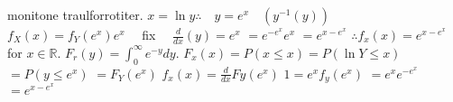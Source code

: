 monitone traulforrotiter.
$x=\ln y \therefore \quad y=e^{x} \quad\left(y^{-1}(y)\right)$
$f_{X}(x)=f_{Y}\left(e^{x}\right) e^{x} \quad$ fix $\quad \frac{d}{d x}(y)=e^{x}$
$=e^{-e^{x}} e^{x}$
$=e^{x-e^{x}}$
$\therefore f_{x}(x)=e^{x-e^{x}} \quad$ for $x \in \mathbb{R}$.
$F_{r}(y)=\int_{0}^{\infty} e^{-y} d y$.
$F_{x}(x)=P(x \leq x)=P(\ln Y \leq x)$
$=P\left(y \leq e^{x}\right)$
$=F_{Y}\left(e^{x}\right)$
$f_{x}(x)=\frac{d}{d x} F y\left(e^{x}\right)$
$1=e^{x} f_{y}\left(e^{x}\right)$
$=e^{x} e^{-e^{x}}$
$=e^{x-e^{x}}$